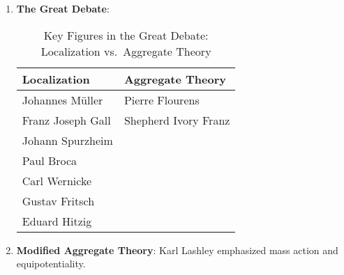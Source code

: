 \begin{enumerate}
    \item \textbf{The Great Debate}:
          \begin{table}[h]
              \centering
              \caption{Key Figures in the Great Debate: Localization vs.\ Aggregate Theory}
              \label{tab:great_debate}
              \begin{tabular}{@{}ll@{}}
                  \toprule
                  \textbf{Localization} & \textbf{Aggregate Theory} \\
                  \midrule
                  Johannes Müller       & Pierre Flourens           \\
                  Franz Joseph Gall     & Shepherd Ivory Franz      \\
                  Johann Spurzheim      &                           \\
                  Paul Broca            &                           \\
                  Carl Wernicke         &                           \\
                  Gustav Fritsch        &                           \\
                  Eduard Hitzig         &                           \\
                  \bottomrule
              \end{tabular}
          \end{table}

    \item \textbf{Modified Aggregate Theory}: Karl Lashley emphasized mass action and equipotentiality.
\end{enumerate}

